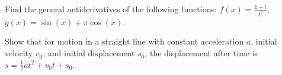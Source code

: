 \documentclass[Calculus 1 Recitation.tex]{subfiles}
\begin{document}
\begin{myleftlinebox}
	Find the general antiderivatives of the following functions: $f(x)=\frac{1+t}{t^2}$, $g(x)=\sin(x)+\pi\cos(x)$.
	\tcblower
	\vspace{2em}
\end{myleftlinebox}

\begin{myleftlinebox}
	Show that for motion in a straight line with constant acceleration $a$, initial velocity $v_0$, and initial displacement $s_0$, the displacement after time is $s=\frac{1}{2}at^2+v_0t+s_0$.
	\tcblower
	\vspace{2em}
\end{myleftlinebox}
\end{document}
